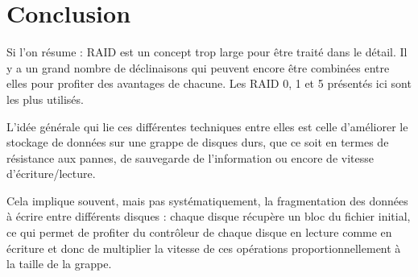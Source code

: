 \section{Conclusion}

Si l'on résume : RAID est un concept trop  large pour être traité dans le détail. Il y a un grand nombre de déclinaisons qui peuvent encore être combinées entre elles pour profiter des avantages de chacune. Les RAID 0, 1 et 5 présentés ici sont les plus utilisés. 

L'idée générale qui lie ces différentes techniques entre elles est celle d'améliorer le stockage de données sur une grappe de disques durs, que ce soit en termes de résistance aux pannes, de sauvegarde de l'information ou encore de vitesse d'écriture/lecture. 

Cela implique souvent, mais pas systématiquement, la fragmentation des données à écrire entre différents disques : chaque disque récupère un bloc du fichier initial, ce qui permet de profiter du contrôleur de chaque disque en lecture comme en écriture et donc de multiplier la vitesse de ces opérations proportionnellement à la taille de la grappe. 